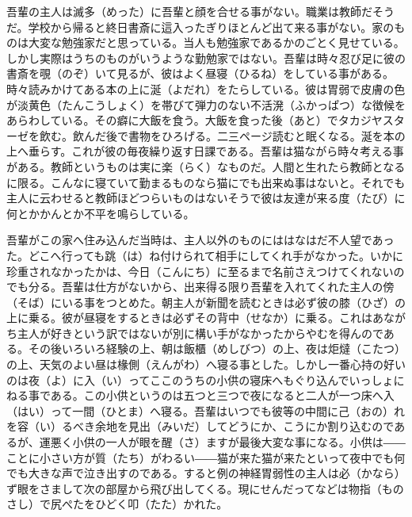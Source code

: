 \documentclass{book}
\begin{document}
吾輩の主人は滅多（めった）に吾輩と顔を合せる事がない。職業は教師だそうだ。学校から帰ると終日書斎に這入ったぎりほとんど出て来る事がない。家のものは大変な勉強家だと思っている。当人も勉強家であるかのごとく見せている。しかし実際はうちのものがいうような勤勉家ではない。吾輩は時々忍び足に彼の書斎を覗（のぞ）いて見るが、彼はよく昼寝（ひるね）をしている事がある。時々読みかけてある本の上に涎（よだれ）をたらしている。彼は胃弱で皮膚の色が淡黄色（たんこうしょく）を帯びて弾力のない不活溌（ふかっぱつ）な徴候をあらわしている。その癖に大飯を食う。大飯を食った後（あと）でタカジヤスターゼを飲む。飲んだ後で書物をひろげる。二三ページ読むと眠くなる。涎を本の上へ垂らす。これが彼の毎夜繰り返す日課である。吾輩は猫ながら時々考える事がある。教師というものは実に楽（らく）なものだ。人間と生れたら教師となるに限る。こんなに寝ていて勤まるものなら猫にでも出来ぬ事はないと。それでも主人に云わせると教師ほどつらいものはないそうで彼は友達が来る度（たび）に何とかかんとか不平を鳴らしている。

吾輩がこの家へ住み込んだ当時は、主人以外のものにははなはだ不人望であった。どこへ行っても跳（は）ね付けられて相手にしてくれ手がなかった。いかに珍重されなかったかは、今日（こんにち）に至るまで名前さえつけてくれないのでも分る。吾輩は仕方がないから、出来得る限り吾輩を入れてくれた主人の傍（そば）にいる事をつとめた。朝主人が新聞を読むときは必ず彼の膝（ひざ）の上に乗る。彼が昼寝をするときは必ずその背中（せなか）に乗る。これはあながち主人が好きという訳ではないが別に構い手がなかったからやむを得んのである。その後いろいろ経験の上、朝は飯櫃（めしびつ）の上、夜は炬燵（こたつ）の上、天気のよい昼は椽側（えんがわ）へ寝る事とした。しかし一番心持の好いのは夜（よ）に入（い）ってここのうちの小供の寝床へもぐり込んでいっしょにねる事である。この小供というのは五つと三つで夜になると二人が一つ床へ入（はい）って一間（ひとま）へ寝る。吾輩はいつでも彼等の中間に己（おの）れを容（い）るべき余地を見出（みいだ）してどうにか、こうにか割り込むのであるが、運悪く小供の一人が眼を醒（さ）ますが最後大変な事になる。小供は――ことに小さい方が質（たち）がわるい――猫が来た猫が来たといって夜中でも何でも大きな声で泣き出すのである。すると例の神経胃弱性の主人は必（かなら）ず眼をさまして次の部屋から飛び出してくる。現にせんだってなどは物指（ものさし）で尻ぺたをひどく叩（たた）かれた。
\end{document}
